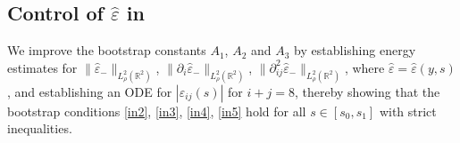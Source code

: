 \documentclass[11pt,reqno]{amsart}
\theoremstyle{definition}
\theoremstyle{bfremark}
\numberwithin{equation}{section}
\newcommand{\veph}{\hat\varepsilon }
\begin{document}
\subsection{Control of \(\veph\) in }
\label{Control of veph in K}

We improve the bootstrap constants \(A_1\), \(A_2\) and \(A_3\) by establishing energy estimates for \(\|\veph_-\|_{L^2_{\rho}(\mathbb{R}^2)}\), \(\|\partial_i \veph_-\|_{L^2_{\rho}(\mathbb{R}^2)}\), \(\|\partial^2 _{ij}\veph_-\|_{L^2_{\rho}(\mathbb{R}^2)}\), where \(\veph=\veph(y,s)\), and establishing an ODE for \(|\veph_{ij}(s)|\) for \(i+j=8\), thereby showing that the bootstrap conditions \ref{in2}, \ref{in3}, \ref{in4}, \ref{in5} hold for all \(s \in [s_0,s_1]\) with strict inequalities.\\
\end{document}
